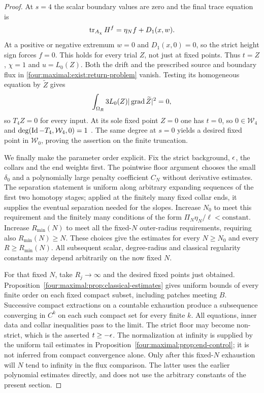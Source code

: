 \begin{proof}
At $s=4$ the scalar boundary values are zero and the final trace
equation is
\[
 \operatorname{tr}_{A_\chi}H^f=\eta_N f+D_1(x,w).
\]
At a positive or negative extremum $w=0$ and $D_1(x,0)=0$, so
the strict height sign forces $f=0$.  This holds for every trial
$Z$, not just at fixed points.  Thus $t=Z$, $\chi=1$ and $u=L_0(Z)$.
Both the drift and the prescribed source and boundary flux in
\eqref{four:maximal:exist:return-problem} vanish.  Testing its homogeneous
equation by $\widetilde Z$ gives
\[
 \int_{\Omega_R}3L_0(Z)|\operatorname{grad}\widetilde Z|^2=0,
\]
so $T_4Z=0$ for every input.  At its sole fixed point $Z=0$ one
has $t=0$, so $0\in\mathcal W_4$ and
$\deg(\operatorname{Id}-T_4,\mathcal W_4,0)=1$
\cite[Chapter~II, \S8, p.~55]{LeraySchauder1934}.
The same degree at $s=0$ yields a desired fixed point in
$\mathcal W_0$, proving the assertion on the finite truncation.

We finally make the parameter order explicit.  Fix the strict
background, $\epsilon$, the collars and the end weights first.
The pointwise floor argument chooses the small $\delta_0$ and a
polynomially large penalty coefficient $C_N$ without derivative
estimates.  The separation statement is uniform along arbitrary
expanding sequences of the first two homotopy stages; applied at
the finitely many fixed collar ends, it supplies the eventual
separation needed for the slopes.  Increase $N_0$ to meet this
requirement and the finitely many conditions of the form
$\Pi_N\eta_N/\ell<\text{constant}$.  Increase $R_{\min}(N)$ to
meet all the fixed-$N$ outer-radius requirements, requiring also
$R_{\min}(N)\ge N$.  These choices give the estimates for every
$N\ge N_0$ and every $R\ge R_{\min}(N)$.
All subsequent scalar, degree-radius and classical regularity
constants may depend arbitrarily on the now fixed $N$.

For that fixed $N$, take $R_j\to\infty$ and the desired fixed
points just obtained.  Proposition~\ref{four:maximal:prop:classical-estimates}
gives uniform bounds of every finite order on each fixed compact
subset, including patches meeting $B$.
Successive compact extractions on a countable exhaustion produce
a subsequence converging in $C^k$ on each such compact set for
every finite $k$.  All equations, inner data and collar inequalities
pass to the limit.  The strict floor may become non-strict, which
is the asserted $t\ge-\epsilon$.
The normalization at infinity is supplied by the uniform tail
estimates in Proposition~\ref{four:maximal:prop:end-control}; it is not inferred
from compact convergence alone.  Only after this fixed-$N$
exhaustion will $N$ tend to infinity in the flux comparison.
The latter uses the earlier polynomial estimates directly, and
does not use the arbitrary constants of the present section.
\end{proof}

